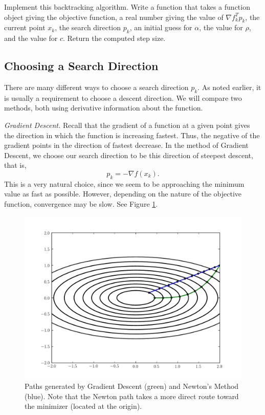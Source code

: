\begin{problem}
Implement this backtracking algorithm. Write a function  that takes a function
object giving the objective function, a real number giving the value of $\nabla f_k^Tp_k$, the 
current point $x_k$, the search direction $p_k$, an initial guess for $\alpha$, the value for
$\rho$, and the value for $c$. Return the computed step size.
\end{problem}

\subsection*{Choosing a Search Direction}
There are many different ways to choose a search direction $p_k$. As noted earlier, it is usually
a requirement to choose a descent direction. We will compare two methods, both using derivative
information about the function.

\emph{Gradient Descent.} Recall that the gradient of a function at a given point gives the direction
in which the function is increasing fastest. Thus, the negative of the gradient points in the direction
of fastest decrease. In the method of Gradient Descent, we choose our search direction to be
this direction of steepest descent, that is,
$$
p_k = -\nabla f(x_k).
$$
This is a very natural choice, since we seem to be approaching the minimum value as fast as possible.
However, depending on the nature of the objective function, convergence may be slow. See Figure 
\ref{linesearch:comparison}.

\begin{figure}
\centering
\includegraphics[width=\textwidth]{comparison.pdf}
\caption{Paths generated by Gradient Descent (green) and Newton's Method (blue).
Note that the Newton path takes a more direct route toward the minimizer (located
at the origin).
}
\label{linesearch:comparison}
\end{figure}

